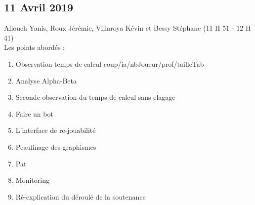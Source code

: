 \documentclass[11pt,a4paper]{article}
\begin{document}
\newpage
\subsection{11 Avril 2019}
Allouch Yanis, Roux Jérémie, Villaroya Kévin et Bessy Stéphane (11 H 51 - 12 H 41)\\

Les points abordés :
\begin{enumerate}
    \item Observation temps de calcul coup/ia/nbJoueur/prof/tailleTab
    \item Analyse Alpha-Beta
    \item Seconde observation du temps de calcul sans elagage
    \item Faire un bot
    \item L'interface de re-jouabilité
    \item Peaufinage des graphismes
    \item Pat
    \item Monitoring
    \item Ré-explication du déroulé de la soutenance
\end{enumerate}

\begin{tabular}{c}
    \hline
\end{tabular}\\
    
\end{document}
